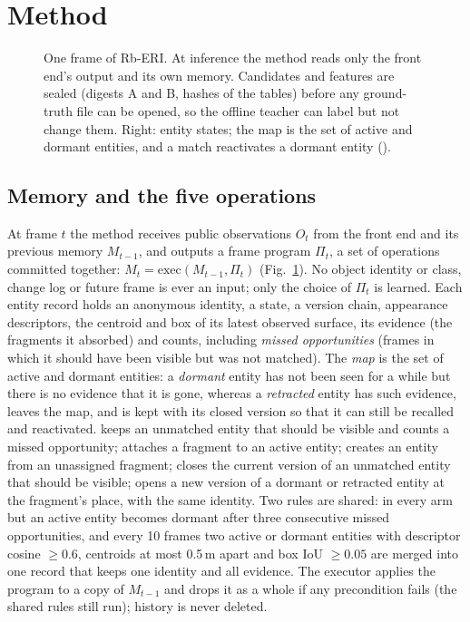 \section{Method}
\label{sec:method}

\begin{figure}[t]
\centering

\caption{One frame of Rb-ERI. At inference the method reads only the front end's output and its own memory. Candidates and features are sealed (digests A and B, hashes of the tables) before any ground-truth file can be opened, so the offline teacher can label but not change them. Right: entity states; the map is the set of active and dormant entities, and a match reactivates a dormant entity ().}
\label{fig:method}
\end{figure}

\subsection{Memory and the five operations}
At frame $t$ the method receives public observations $O_t$ from the front end and its previous memory $M_{t-1}$, and outputs a frame program $\Pi_t$, a set of operations committed together: $M_t=\mathrm{exec}(M_{t-1},\Pi_t)$ (Fig.~\ref{fig:method}).
No object identity or class, change log or future frame is ever an input; only the choice of $\Pi_t$ is learned.
Each entity record holds an anonymous identity, a state, a version chain, appearance descriptors, the centroid and box of its latest observed surface, its evidence (the fragments it absorbed) and counts, including \emph{missed opportunities} (frames in which it should have been visible but was not matched).
The \emph{map} is the set of active and dormant entities: a \emph{dormant} entity has not been seen for a while but there is no evidence that it is gone, whereas a \emph{retracted} entity has such evidence, leaves the map, and is kept with its closed version so that it can still be recalled and reactivated.
 keeps an unmatched entity that should be visible and counts a missed opportunity;  attaches a fragment to an active entity;  creates an entity from an unassigned fragment;  closes the current version of an unmatched entity that should be visible;  opens a new version of a dormant or retracted entity at the fragment's place, with the same identity.
Two rules are shared: in every arm but  an active entity becomes dormant after three consecutive missed opportunities, and every 10 frames two active or dormant entities with descriptor cosine $\geq 0.6$, centroids at most 0.5\,m apart and box IoU $\geq 0.05$ are merged into one record that keeps one identity and all evidence.
The executor applies the program to a copy of $M_{t-1}$ and drops it as a whole if any precondition fails (the shared rules still run); history is never deleted.

